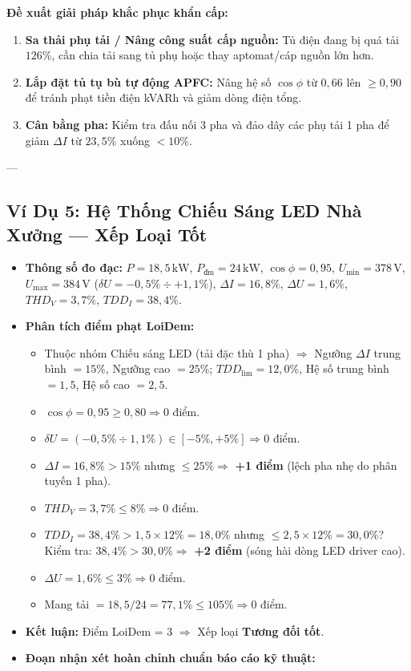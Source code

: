 \documentclass[12pt,a4paper]{article}
\begin{document}
\textbf{Đề xuất giải pháp khắc phục khẩn cấp:}
\begin{enumerate}
  \item \textbf{Sa thải phụ tải / Nâng công suất cấp nguồn:} Tủ điện đang bị quá tải $126\%$, cần chia tải sang tủ phụ hoặc thay aptomat/cáp nguồn lớn hơn.
  \item \textbf{Lắp đặt tủ tụ bù tự động APFC:} Nâng hệ số $\cos\phi$ từ $0{,}66$ lên $\ge 0{,}90$ để tránh phạt tiền điện kVARh và giảm dòng điện tổng.
  \item \textbf{Cân bằng pha:} Kiểm tra đấu nối 3 pha và đảo dây các phụ tải 1 pha để giảm $\Delta I$ từ $23{,}5\%$ xuống $< 10\%$.
\end{enumerate}

---

\subsection{\texorpdfstring{Ví Dụ 5: Hệ Thống Chiếu Sáng LED Nhà Xưởng --- Xếp Loại Tốt}{Ví Dụ 5: Hệ Thống Chiếu Sáng LED Nhà Xưởng --- Xếp Loại Tốt}}

\begin{itemize}
  \item \textbf{Thông số đo đạc:} $P = 18{,}5\,\mathrm{kW}$, $P_{\text{đm}} = 24\,\mathrm{kW}$, $\cos\phi = 0{,}95$, $U_{\min} = 378\,\mathrm{V}$, $U_{\max} = 384\,\mathrm{V}$ ($\delta U = -0{,}5\% \div +1{,}1\%$), $\Delta I = 16{,}8\%$, $\Delta U = 1{,}6\%$, $THD_V = 3{,}7\%$, $TDD_I = 38{,}4\%$.
  \item \textbf{Phân tích điểm phạt LoiDem:}
  \begin{itemize}
    \item Thuộc nhóm Chiếu sáng LED (tải đặc thù 1 pha) $\Rightarrow$ Ngưỡng $\Delta I$ trung bình $= 15\%$, Ngưỡng cao $= 25\%$; $TDD_{\mathrm{lim}} = 12{,}0\%$, Hệ số trung bình $= 1{,}5$, Hệ số cao $= 2{,}5$.
    \item $\cos\phi = 0{,}95 \ge 0{,}80 \Rightarrow 0$ điểm.
    \item $\delta U = (-0{,}5\% \div 1{,}1\%) \in [-5\%, +5\%] \Rightarrow 0$ điểm.
    \item $\Delta I = 16{,}8\% > 15\%$ nhưng $\le 25\% \Rightarrow$ \textbf{+1 điểm} (lệch pha nhẹ do phân tuyến 1 pha).
    \item $THD_V = 3{,}7\% \le 8\% \Rightarrow 0$ điểm.
    \item $TDD_I = 38{,}4\% > 1{,}5 \times 12\% = 18{,}0\%$ nhưng $\le 2{,}5 \times 12\% = 30{,}0\%$? Kiểm tra: $38{,}4\% > 30{,}0\% \Rightarrow$ \textbf{+2 điểm} (sóng hài dòng LED driver cao).
    \item $\Delta U = 1{,}6\% \le 3\% \Rightarrow 0$ điểm.
    \item Mang tải $= 18{,}5 / 24 = 77{,}1\% \le 105\% \Rightarrow 0$ điểm.
  \end{itemize}
  \item \textbf{Kết luận:} Điểm LoiDem = 3 $\Rightarrow$ Xếp loại \textbf{\color{warningyellow}Tương đối tốt}.
  \item \textbf{Đoạn nhận xét hoàn chỉnh chuẩn báo cáo kỹ thuật:}
\end{itemize}
\end{document}
